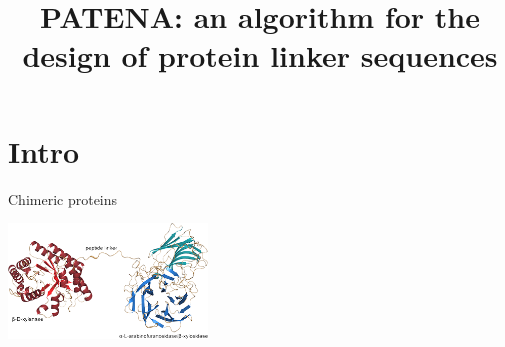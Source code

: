 \documentclass{beamer}
\title{PATENA: an algorithm for the design of protein linker sequences}
\begin{document}
\begin{frame}
 \titlepage
\end{frame}

\section{Intro}

\begin{frame}{Chimeric proteins}

% 

\includegraphics[width=200px]{../img/fusionEnzymes.png}
\end{frame}
\end{document}
